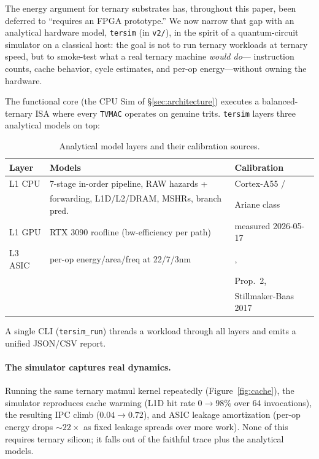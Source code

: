 \documentclass{article}
\begin{document}
The energy argument for ternary substrates has, throughout this paper,
been deferred to ``requires an {FPGA} prototype.'' We now narrow that
gap with an analytical hardware model, \texttt{tersim} (in
\texttt{v2/}), in the spirit of a quantum-circuit simulator on a
classical host: the goal is not to run ternary workloads at ternary
speed, but to smoke-test what a real ternary machine \emph{would do}---
instruction counts, cache behavior, cycle estimates, and per-op
energy---without owning the hardware.

The functional core (the {CPU} {Sim} of \S\ref{sec:architecture})
executes a balanced-ternary {ISA} where every \texttt{TVMAC} operates
on genuine trits. \texttt{tersim} layers three analytical models on top:

\begin{table}[h]
\centering
\caption{Analytical model layers and their calibration sources.}
\begin{tabular}{lll}
\toprule
Layer & Models & Calibration \\
\midrule
L1 CPU & 7-stage in-order pipeline, RAW hazards + & Cortex-A55 / \\
       & forwarding, L1D/L2/DRAM, MSHRs, branch pred. & Ariane class \\
L1 GPU & RTX 3090 roofline (bw-efficiency per path) & measured 2026-05-17 \\
L3 ASIC & per-op energy/area/freq at 22/7/3nm & \citet{horowitz-energy-2014}, \\
        & & \citet{cuevas-formal-2026} Prop.~2, \\
        & & Stillmaker-Baas 2017 \\
\bottomrule
\end{tabular}
\end{table}

A single {CLI} (\texttt{tersim\_run}) threads a workload through all
layers and emits a unified {JSON}/{CSV} report.

\paragraph{The simulator captures real dynamics.}
Running the same ternary matmul kernel repeatedly
(Figure~\ref{fig:cache}), the simulator reproduces cache warming
(L1D hit rate $0 \to 98\%$ over 64 invocations), the resulting {IPC}
climb ($0.04 \to 0.72$), and {ASIC} leakage amortization (per-op
energy drops $\sim 22\times$ as fixed leakage spreads over more work).
None of this requires ternary silicon; it falls out of the faithful
trace plus the analytical models.
\end{document}

